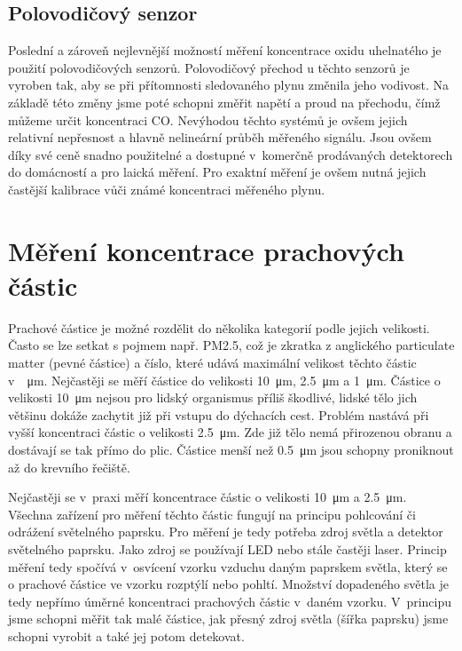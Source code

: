 \subsection{Polovodičový senzor}

Poslední a zároveň nejlevnější možností měření koncentrace oxidu uhelnatého je použití polovodičových senzorů. Polovodičový přechod u těchto senzorů je vyroben tak, aby se při přítomnosti sledovaného plynu změnila jeho vodivost. Na základě této změny jsme poté schopni změřit napětí a proud na přechodu, čímž můžeme určit koncentraci CO. Nevýhodou těchto systémů je ovšem jejich relativní nepřesnost a hlavně nelineární průběh měřeného signálu. Jsou ovšem díky své ceně snadno použitelné a dostupné v~komerčně prodávaných detektorech do domácností a pro laická měření. Pro exaktní měření je ovšem nutná jejich častější kalibrace vůči známé koncentraci měřeného plynu.

\section{Měření koncentrace prachových částic}

Prachové částice je možné rozdělit do několika kategorií podle jejich velikosti. Často se lze setkat s pojmem např. PM2.5, což je zkratka z anglického particulate matter (pevné částice) a číslo, které udává maximální velikost těchto částic v~\SI{}{\micro\metre}. Nejčastěji se měří částice do velikosti \SI{10}{\micro\metre}, \SI{2,5}{\micro\metre} a \SI{1}{\micro\metre}. Částice o velikosti \SI{10}{\micro\metre} nejsou pro lidský organismus příliš škodlivé, lidské tělo jich většinu dokáže zachytit již při vstupu do dýchacích cest. Problém nastává při vyšší koncentraci částic o velikosti \SI{2,5}{\micro\metre}. Zde již tělo nemá přirozenou obranu a dostávají se tak přímo do plic. Částice menší než \SI{0,5}{\micro\metre} jsou schopny proniknout až do krevního řečiště.

Nejčastěji se v~praxi měří koncentrace částic o velikosti \SI{10}{\micro\metre} a \SI{2,5}{\micro\metre}. Všechna zařízení pro měření těchto částic fungují na principu pohlcování či odrážení světelného paprsku. Pro měření je tedy potřeba zdroj světla a detektor světelného paprsku. Jako zdroj se používají LED nebo stále častěji laser. Princip měření tedy spočívá v~osvícení vzorku vzduchu daným paprskem světla, který se o prachové částice ve vzorku rozptýlí nebo pohltí. Množství dopadeného světla je tedy nepřímo úměrné koncentraci prachových částic v~daném vzorku. V~principu jsme schopni měřit tak malé částice, jak přesný zdroj světla (šířka paprsku) jsme schopni vyrobit a také jej potom detekovat.

